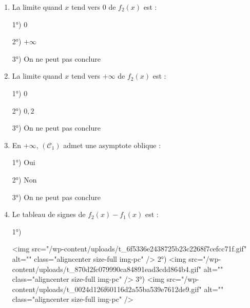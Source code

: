 \begin{enumerate}
     \item
     La limite quand $x$ tend vers $0$ de $f_{2}\left(x\right)$ est :
     \par
     1°) $0$
     \par
     2°) $+ \infty $
     \par
     3°) On ne peut pas conclure
     \item
     La limite quand $x$ tend vers $+ \infty $ de $f_{2}\left(x\right)$ est :
     \par
     1°) $0$
     \par
     2°) $0,2$
     \par
     3°) On ne peut pas conclure
     \item
     En $+\infty $, $\left(\mathscr C_{1}\right)$ admet une asymptote oblique :
     \par
     1°) Oui
     \par
     2°) Non
     \par
     3°) On ne peut pas conclure
     \item
     Le tableau de signes de $f_{2}\left(x\right)-f_{1}\left(x\right)$ est :
     \par
     1°)
\begin{center}
 \begin{extern}%
   \end{extern}
\end{center}
<img src="/wp-content/uploads/t_6f5336e2438725b23c2268f7cefcc71f.gif" alt="" class="aligncenter size-full  img-pc" />
     2°)
     <img src="/wp-content/uploads/t_870d2fc079990ca84891ead3cdd864b4.gif" alt="" class="aligncenter size-full  img-pc" />
     3°)
     <img src="/wp-content/uploads/t_0024d126f60116d2a55ba539e7612de9.gif" alt="" class="aligncenter size-full  img-pc" />
\end{enumerate}
